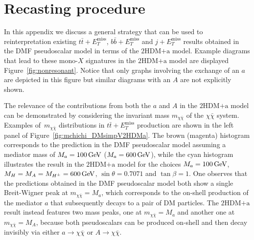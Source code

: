 \documentclass[a4paper, 11pt,notoc]{article}
\newcommand{\MET}{\ensuremath{E_T^\mathrm{miss}}\xspace}
\newcommand{\mA}{\ensuremath{M_{A}}\xspace}
\newcommand{\ma}{\ensuremath{M_{a}}\xspace}
\newcommand{\mH}{\ensuremath{M_{H}}\xspace}
\newcommand{\mHc}{\ensuremath{M_{H^{\pm}}}\xspace}
\newcommand{\hdma}{\ensuremath{\textrm{2HDM+a}}\xspace}
\begin{document}
\appendix

\section{Recasting procedure}
\label{app:recast}

In this appendix we discuss  a general strategy that can be used to {\color{green} reinterpretation} existing $t \bar t + \MET$, $b \bar b + \MET$ and $j + \MET$ results obtained in the DMF pseudoscalar model in terms of the \hdma model. Example diagrams that lead to these mono-$X$ signatures in the \hdma model are displayed Figure~\ref{fig:nonresonant}. Notice that only graphs involving the exchange of an $a$ are depicted in this figure but similar diagrams  with an  $A$ are not explicitly shown. 

{\color{red} The relevance of the contributions from both the $a$ and $A$ in the \hdma model can be  demonstrated by considering the invariant mass $m_{\chi \bar \chi}$ of the $\chi \bar \chi$ system.} Examples of~$m_{\chi \bar \chi}$ distributions in $t \bar t + \MET$ production are shown in the left panel of Figure~\ref{fig:mchichi_DMsimpV2HDMa}. The brown (magenta) histogram corresponds to the prediction in the DMF pseudoscalar model assuming a mediator mass of $\ma =100 \, {\rm  GeV}$ ($\ma =600 \, {\rm  GeV}$), while the cyan histogram illustrates the result in the \hdma model for the choices $\ma = 100 \, {\rm  GeV}$, $\mH = \mA = \mHc = 600 \, {\rm  GeV}$, $\sin\theta=0.7071$ and $\tan\beta=1$. One observes that the predictions obtained in the  DMF pseudoscalar model both show a single  Breit-Wigner  peak  at $m_{\chi \bar \chi} = \ma$, which corresponds to the on-shell production of the mediator $a$ that subsequently decays to a pair of DM particles. The \hdma result instead features two mass peaks, one at $m_{\chi \bar \chi} = \ma$ and another one at $m_{\chi \bar \chi} = \mA$, because both pseudoscalars can be produced on-shell and then decay invisibly via either $a \to \chi \bar \chi$ or $A \to \chi \bar \chi$.  
\end{document}
